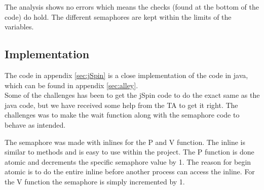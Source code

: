 The analysis shows no errors which means the checks (found at the bottom of the code) do hold. The different semaphores are kept within the limits of the variables. 

\subsection{Implementation}
The code in appendix \ref{sec:jSpin} is a close implementation of the code in java, which can be found in appendix \ref{sec:alley}.
\\

Some of the challenges has been to get the jSpin code to do the exact same as the java code, but we have received some help from the TA to get it right. The challenges was to make the wait function along with the semaphore code to behave as intended. 

The semaphore was made with inlines for the P and V function. The inline is similar to methods and is easy to use within the project. The P function is done atomic and decrements the specific semaphore value by 1. The reason for begin atomic is to do the entire inline before another process can access the inline. For the V function the semaphore is simply incremented by 1.